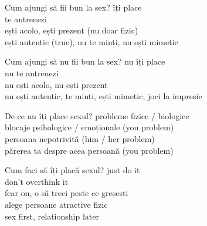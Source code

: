 \documentclass{simple}
\begin{document}
\begin{frame}{Cum ajungi să fii bun la sex?}
  \centering
  \Large
  \pause
  îți place \\
  \vspace{1cm}
  \pause
  te antrenezi \\
  \vspace{1cm}
  \pause
  ești acolo, ești prezent (nu doar fizic) \\
  \vspace{1cm}
  \pause
  ești autentic (true), nu te minți, nu ești mimetic
\end{frame}

\begin{frame}{Cum ajungi să nu fii bun la sex?}
  \centering
  \Large
  \pause
  nu îți place \\
  \vspace{1cm}
  \pause
  nu te antrenezi \\
  \vspace{1cm}
  \pause
  nu ești acolo, nu ești prezent \\
  \vspace{1cm}
  \pause
  nu ești autentic, te minți, ești mimetic, joci la impresie
\end{frame}

\begin{frame}{De ce nu îți place sexul?}
  \centering
  \Large
  \pause
  probleme fizice / biologice \\
  \vspace{1cm}
  \pause
  blocaje psihologice / emoționale (you problem) \\
  \vspace{1cm}
  \pause
  persoana nepotrivită (him / her problem) \\
  \vspace{1cm}
  \pause
  părerea ta despre acea persoană (you problem)
\end{frame}

\begin{frame}{Cum faci să îți placă sexul?}
  \centering
  \Large
  \pause
  just do it \\
  \vspace{1cm}
  \pause
  don't overthink it \\
  \vspace{1cm}
  \pause
  fear on, o să treci peste ce greșești \\
  \vspace{1cm}
  \pause
  alege persoane atractive fizic \\
  \vspace{1cm}
  \pause
  sex first, relationship later
\end{frame}
\end{document}
